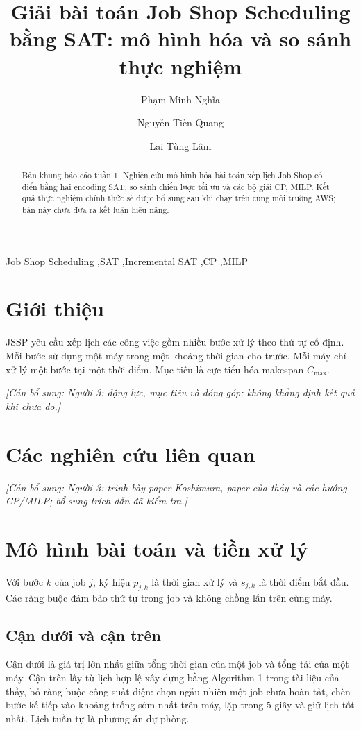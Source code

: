 \documentclass[a4paper,fleqn]{cas-sc}
\newcommand{\todo}[1]{\par\noindent\textit{[Cần bổ sung: #1]}\par}
\begin{document}
\title[mode=title]{Giải bài toán Job Shop Scheduling bằng SAT: mô hình hóa và so sánh thực nghiệm}
\author[1]{Phạm Minh Nghĩa}
\author[1]{Nguyễn Tiến Quang}
\author[1]{Lại Tùng Lâm}
\begin{abstract}
Bản khung báo cáo tuần 1. Nghiên cứu mô hình hóa bài toán xếp lịch Job Shop cổ điển bằng hai encoding SAT, so sánh chiến lược tối ưu và các bộ giải CP, MILP. Kết quả thực nghiệm chính thức sẽ được bổ sung sau khi chạy trên cùng môi trường AWS; bản này chưa đưa ra kết luận hiệu năng.
\end{abstract}
\begin{keywords}
Job Shop Scheduling \sep SAT \sep Incremental SAT \sep CP \sep MILP
\end{keywords}
\maketitle
\section{Giới thiệu}
JSSP yêu cầu xếp lịch các công việc gồm nhiều bước xử lý theo thứ tự cố định. Mỗi bước sử dụng một máy trong một khoảng thời gian cho trước. Mỗi máy chỉ xử lý một bước tại một thời điểm. Mục tiêu là cực tiểu hóa makespan $C_{\max}$.
\todo{Người 3: động lực, mục tiêu và đóng góp; không khẳng định kết quả khi chưa đo.}
\section{Các nghiên cứu liên quan}
\todo{Người 3: trình bày paper Koshimura, paper của thầy và các hướng CP/MILP; bổ sung trích dẫn đã kiểm tra.}
\section{Mô hình bài toán và tiền xử lý}
Với bước $k$ của job $j$, ký hiệu $p_{j,k}$ là thời gian xử lý và $s_{j,k}$ là thời điểm bắt đầu. Các ràng buộc đảm bảo thứ tự trong job và không chồng lấn trên cùng máy.
\subsection{Cận dưới và cận trên}
Cận dưới là giá trị lớn nhất giữa tổng thời gian của một job và tổng tải của một máy. Cận trên lấy từ lịch hợp lệ xây dựng bằng Algorithm 1 trong tài liệu của thầy, bỏ ràng buộc công suất điện: chọn ngẫu nhiên một job chưa hoàn tất, chèn bước kế tiếp vào khoảng trống sớm nhất trên máy, lặp trong 5 giây và giữ lịch tốt nhất. Lịch tuần tự là phương án dự phòng.
\end{document}

